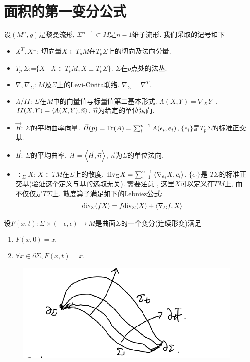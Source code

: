 \section{面积的第一变分公式}
设$(M^n,g)$是黎曼流形, $\Sigma^{n-1}\subset M$是$n-1$维子流形. 我们采取的记号如下
\begin{itemize}
    \item $X^T,X^\perp$: 切向量$X \in T_pM$在$T_p\Sigma$上的切向及法向分量.
    \item $T_p^\perp \Sigma$:=$\{X\mid X\in T_pM, X\perp T_p\Sigma\}$. $\Sigma$在$p$点处的法丛.
    \item $\nabla,\nabla_\Sigma$: $M$及$\Sigma$上的Levi-Civita联络. $\nabla_\Sigma=\nabla^{T}$.
    \item $A/II$: $\Sigma$在$M$中的向量值与标量值第二基本形式. $A(X,Y)=\nabla_XY^\perp$. $II(X,Y)={\left < A(X,Y), \vec{n} \right >}$. $\vec{n}$为给定的单位法向.
    \item $\vec{H}$: $\Sigma$的平均曲率向量. $\vec{H}(p)=\text{Tr}(A)=\sum_{i}^{n-1}A(e_i,e_i)$, $\{e_i\}$是$T_p\Sigma$的标准正交基.
    \item $\vec{H}$: $\Sigma$的平均曲率. $H={\left < \vec{H}, \vec{n} \right >}$, $\vec{n}$为$\Sigma$的单位法向.
    \item $\div_\Sigma X$: $X \in TM$在$\Sigma$上的散度. ${\text{div}}_\Sigma X=\sum_{i=1}^{n-1}{\left < \nabla_{e_i}X, e_i \right >}$. $\{e_i\}$是 $T\Sigma$的标准正交基(验证这个定义与基的选取无关). 需要注意 , 这里$X$可以定义在$TM$上, 而不仅仅是$T\Sigma$上. 散度算子满足如下的Lebniez公式:
    \begin{equation}
        {\text{div}}_\Sigma(fX)=f{\text{div}}_\Sigma(X)+{\left < \nabla_\Sigma f, X \right >}
    \end{equation}
\end{itemize}
设$F(x,t): \Sigma \times (-\epsilon, \epsilon) \to M$是曲面$\Sigma$的一个变分(连续形变)满足
\begin{enumerate}
    \item $F(x,0)=x$.
    \item $\forall x \in \partial \Sigma, F(x,t)=x$.
\end{enumerate}

\begin{figure}[h]
	\centering
	\includegraphics[scale=0.5]{images/variation.png}
	\caption{}
	\label{variation_p}
\end{figure}


